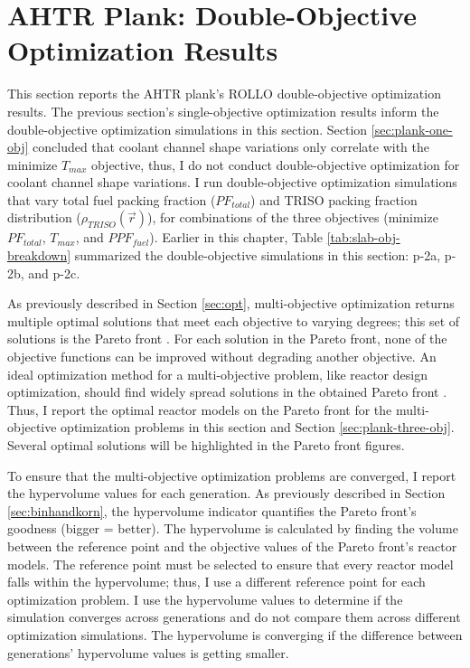 \section{AHTR Plank: Double-Objective Optimization Results}
\label{sec:plank-two-obj}
This section reports the \gls{AHTR} plank's \gls{ROLLO} double-objective optimization 
results. 
The previous section's single-objective optimization results inform the double-objective 
optimization simulations in this section.
Section \ref{sec:plank-one-obj} concluded that coolant channel shape variations 
only correlate with the minimize $T_{max}$ objective, thus, I do not conduct 
double-objective optimization for coolant channel shape variations.
I run double-objective optimization simulations that vary total fuel packing 
fraction ($PF_{total}$) and \gls{TRISO} packing fraction distribution 
($\rho_{TRISO}(\vec{r})$), for combinations of the three objectives (minimize 
$PF_{total}$, $T_{max}$, and $PPF_{fuel}$). 
Earlier in this chapter, Table \ref{tab:slab-obj-breakdown} summarized the double-objective 
simulations in this section: p-2a, p-2b, and p-2c.

As previously described in Section \ref{sec:opt}, multi-objective optimization returns 
multiple optimal solutions that meet each objective to varying degrees; this set of 
solutions is the Pareto front \cite{deb_multi-objective_2001}. 
For each solution in the Pareto front, none of the objective functions can be 
improved without degrading another objective.
An ideal optimization method for a multi-objective problem, like reactor design 
optimization, should find widely spread solutions in the obtained Pareto front 
\cite{deb_multi-objective_2001}. 
Thus, I report the optimal reactor models on the Pareto front for the multi-objective 
optimization problems in this section and Section \ref{sec:plank-three-obj}. 
Several optimal solutions will be highlighted in the Pareto front figures. 

To ensure that the multi-objective optimization problems are converged, I report the 
hypervolume values for each generation. 
As previously described in Section \ref{sec:binhandkorn}, the hypervolume indicator 
quantifies the Pareto front's goodness (bigger = better).
The hypervolume is calculated by finding the volume between the reference point and 
the objective values of the Pareto front's reactor models. 
The reference point must be selected to ensure that every reactor model falls within 
the hypervolume; thus, I use a different reference point for each optimization problem.
I use the hypervolume values to determine if the simulation converges across generations 
and do not compare them across different optimization simulations.
The hypervolume is converging if the difference between generations' hypervolume values 
is getting smaller. 

